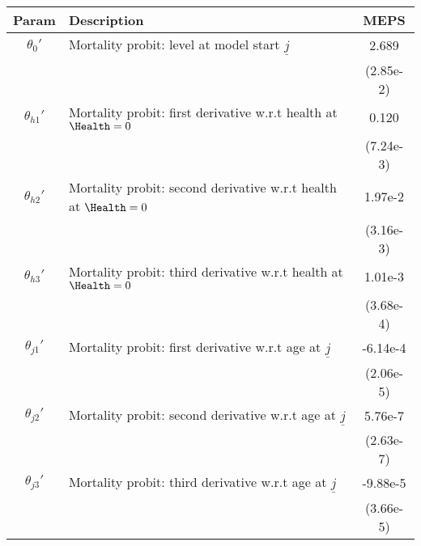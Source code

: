 \begin{table}[ht]\label{MEPSwomenMortParams}
\footnotesize
\begin{center}
\begin{tabular}{clc}
\hline \hline
Param & Description & MEPS \\
\hline
$\theta_{0}'$ & Mortality probit: level at model start $\underline{j}$ & 2.689 \\
 & & (2.85e-2) \\
$\theta_{h1}'$ & Mortality probit: first derivative w.r.t health at $\Health=0$ & 0.120 \\
 & & (7.24e-3) \\
$\theta_{h2}'$ & Mortality probit: second derivative w.r.t health at $\Health=0$ & 1.97e-2 \\
 & & (3.16e-3) \\
$\theta_{h3}'$ & Mortality probit: third derivative w.r.t health at $\Health=0$ & 1.01e-3 \\
 & & (3.68e-4) \\
$\theta_{j1}'$ & Mortality probit: first derivative w.r.t age at $\underline{j}$ & -6.14e-4 \\
 & & (2.06e-5) \\
$\theta_{j2}'$ & Mortality probit: second derivative w.r.t age at $\underline{j}$ & 5.76e-7 \\
 & & (2.63e-7) \\
$\theta_{j3}'$ & Mortality probit: third derivative w.r.t age at $\underline{j}$ & -9.88e-5 \\
 & & (3.66e-5) \\
\hline\hline
\end{tabular}
\end{center}
\end{table}
